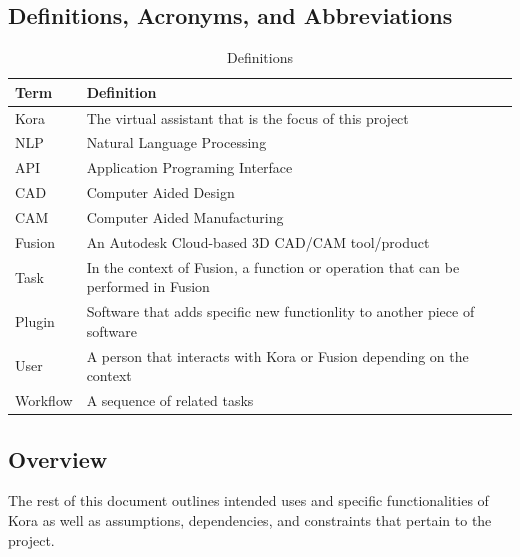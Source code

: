 \documentclass[onecolumn, draftclsnofoot,10pt, compsoc]{IEEEtran}
\def \botname{Kora\xspace}
\begin{document}
    \subsection{Definitions, Acronyms, and Abbreviations}
        \begin{table}[h]
            \centering
            \caption{Definitions}
            \label{my-label}
            \begin{tabular}{|l|l|}
                \hline
                \textbf{Term} & \textbf{Definition} \\ \hline
                \botname & The virtual assistant that is the focus of this project \\ \hline
                NLP & Natural Language Processing \\ \hline
                API & Application Programing Interface \\ \hline
                CAD & Computer Aided Design \\ \hline
                CAM & Computer Aided Manufacturing \\ \hline
                Fusion & An Autodesk Cloud-based 3D CAD/CAM tool/product \\ \hline
                Task & In the context of Fusion, a function or operation that can be performed in Fusion \\ \hline
                Plugin & Software that adds specific new functionlity to another piece of software \\ \hline
                User & A person that interacts with \botname or Fusion depending on the context \\ \hline
                Workflow & A sequence of related tasks \\ \hline
            \end{tabular}
        \end{table}
    \subsection{Overview}
        The rest of this document outlines intended uses and specific functionalities of \botname as well as assumptions, dependencies, and constraints that pertain to the project. 
\end{document}
